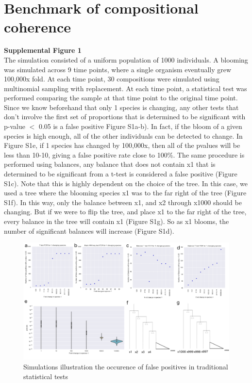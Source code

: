 \section{Benchmark of compositional coherence}
\textbf{Supplemental Figure 1}\\[5 mm]
The simulation consisted of a uniform population of 1000 individuals.  A blooming was simulated across 9 time points, where a single organism eventually grew 100,000x fold.  At each time point, 30 compositions were simulated using multinomial sampling with replacement.  At each time point, a statistical test was performed comparing the sample at that time point to the original time point.  Since we know beforehand that only 1 species is changing, any other tests that don’t involve the first set of proportions that is determined to be significant with p-value $<$ 0.05 is a false positive Figure S1a-b).  In fact, if the bloom of a given species is high enough, all of the other individuals can be detected to change.  In Figure S1e, if 1 species has changed by 100,000x, then all of the pvalues will be less than 10-10, giving a false positive rate close to 100\%.  The same procedure is performed using balances, any balance that does not contain x1 that is determined to be significant from a t-test is considered a false positive (Figure S1c).  Note that this is highly dependent on the choice of the tree.  In this case, we used a tree where the blooming species x1 was to the far right of the tree (Figure S1f).  In this way, only the balance between x1, and x2 through x1000 should be changing.  But if we were to flip the tree, and place x1 to the far right of the tree, every balance in the tree will contain x1 (Figure S1g).  So as x1 blooms, the number of significant balances will increase (Figure S1d).\\[5 mm]
\begin{figure}[H]
        \centering
        \includegraphics[width=1\textwidth]{appendix_b/sup_figure1.png}
        \caption[A benchmark of statistical tests on compositional data.]{Simulations illustration the occurence of false positives in
          traditional statistical tests}
        \label{figbS1}
\end{figure}
